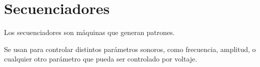 \documentclass[../principal.tex]{subfiles}
\begin{document}

\chapter{Secuenciadores}

Los secuenciadores son máquinas que generan patrones.

Se usan para controlar distintos parámetros sonoros, como frecuencia, amplitud, o cualquier otro parámetro que pueda ser controlado por voltaje.

\newpage
\end{document}
